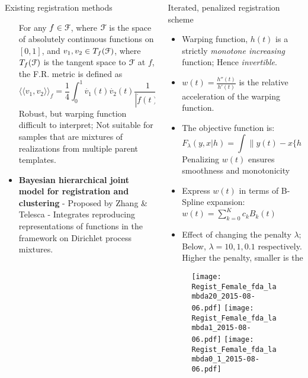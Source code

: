 \documentclass[final]{beamer}
\newlength{\onecolwid}
\begin{document}
\begin{frame}{}
\begin{columns}[t]
\begin{column}{\onecolwid}
\begin{block}{Existing registration methods}
\begin{itemize}
            For any $f \in \mathcal{F}$, where $\mathcal{F}$ is the space of absolutely continuous functions on $[0,1]$, and $v_1, v_2 \in T_f(\mathcal{F})$, where $T_f(\mathcal{F})$ is the tangent space to $\mathcal{F}$ at $f$, the F.R. metric is defined as $$\langle \langle v_1, v_2 \rangle \rangle_f = \frac{1}{4}\int_0^1\dot{v_1}(t) \dot{v_2}(t)\frac{1}{|\dot{f}(t)|}dt$$
            Robust, but warping function difficult to interpret; Not suitable for samples that are mixtures of realizations from multiple parent templates.
          \item {\bf{Bayesian hierarchical joint model for registration and clustering}} - Proposed by Zhang \& Telesca - Integrates reproducing representations of functions in the framework on Dirichlet process mixtures.
            
        \end{itemize}
      \end{block}
    \end{column}

    \begin{column}{\onecolwid}\vspace{-1in}
      \begin{block}{Iterated, penalized registration scheme}
        \begin{itemize}
        \item Warping function, $h(t)$ is a strictly {\emph{monotone increasing}} function; Hence {\emph{invertible}}.
        \item $w(t) = \frac{h''(t)}{h'(t)}$ is the relative acceleration of the warping function. 
        \item The objective function is:
          \[ F_{\lambda}(y,x|h) = \int \|y(t) - x\{h(t)\} \|^2 dt + \lambda \int w^2(t) dt \]
          Penalizing $w(t)$ ensures smoothness and monotonicity
        \item Express $w(t)$ in terms of B-Spline expansion: 
          $w(t) = \sum \limits_{k=0}^{K} c_k B_k(t)$
        \item Effect of changing the penalty $\lambda$; Below, $\lambda = 10, 1, 0.1$ respectively. Higher the penalty, smaller is the 
        \end{itemize}
        \begin{figure}
          \texttt{[image: Regist\_Female\_fda\_lambda20\_2015-08-06.pdf]}
          \texttt{[image: Regist\_Female\_fda\_lambda1\_2015-08-06.pdf]}
          \texttt{[image: Regist\_Female\_fda\_lambda0\_1\_2015-08-06.pdf]} \\


\end{figure}
\end{block}
\end{column}
\end{columns}
\end{frame}
\end{document}

